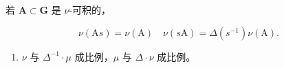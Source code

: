 若 \(\mathbf{A}\subset \mathbf{G}\) 是 \(\nu\)-可积的，

\[
\nu (\mathrm{A} s) = \nu (\mathrm{A}) \quad \nu (s \mathrm{A}) = \Delta (s ^ {- 1}) \nu (\mathrm{A}).
\]

\begin{enumerate}
\def\labelenumi{\arabic{enumi})}
\setcounter{enumi}{2}
\tightlist
\item
  \(\nu\) 与 \(\Delta^{-1} \cdot \mu\) 成比例，\(\mu\) 与 \(\Delta \cdot \nu\) 成比例。
\end{enumerate}


